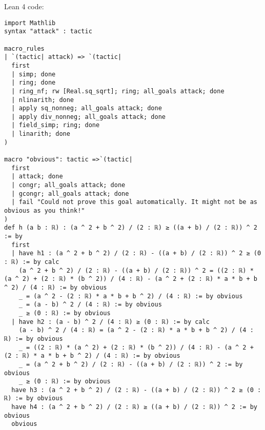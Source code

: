 \documentclass{article}
\begin{document}
Lean 4 code:
\begin{tcolorbox}[colback=white!10, width=\linewidth]
\begin{lstlisting}[language=Lean4]
import Mathlib
syntax "attack" : tactic

macro_rules
| `(tactic| attack) => `(tactic|
  first
  | simp; done
  | ring; done
  | ring_nf; rw [Real.sq_sqrt]; ring; all_goals attack; done
  | nlinarith; done
  | apply sq_nonneg; all_goals attack; done
  | apply div_nonneg; all_goals attack; done
  | field_simp; ring; done
  | linarith; done
)

macro "obvious": tactic =>`(tactic|
  first
  | attack; done
  | congr; all_goals attack; done
  | gcongr; all_goals attack; done
  | fail "Could not prove this goal automatically. It might not be as obvious as you think!"
)
def h (a b : ℝ) : (a ^ 2 + b ^ 2) / (2 : ℝ) ≥ ((a + b) / (2 : ℝ)) ^ 2 := by
  first
  | have h1 : (a ^ 2 + b ^ 2) / (2 : ℝ) - ((a + b) / (2 : ℝ)) ^ 2 ≥ (0 : ℝ) := by calc
    (a ^ 2 + b ^ 2) / (2 : ℝ) - ((a + b) / (2 : ℝ)) ^ 2 = ((2 : ℝ) * (a ^ 2) + (2 : ℝ) * (b ^ 2)) / (4 : ℝ) - (a ^ 2 + (2 : ℝ) * a * b + b ^ 2) / (4 : ℝ) := by obvious
    _ = (a ^ 2 - (2 : ℝ) * a * b + b ^ 2) / (4 : ℝ) := by obvious
    _ = (a - b) ^ 2 / (4 : ℝ) := by obvious
    _ ≥ (0 : ℝ) := by obvious
  | have h2 : (a - b) ^ 2 / (4 : ℝ) ≥ (0 : ℝ) := by calc
    (a - b) ^ 2 / (4 : ℝ) = (a ^ 2 - (2 : ℝ) * a * b + b ^ 2) / (4 : ℝ) := by obvious
    _ = ((2 : ℝ) * (a ^ 2) + (2 : ℝ) * (b ^ 2)) / (4 : ℝ) - (a ^ 2 + (2 : ℝ) * a * b + b ^ 2) / (4 : ℝ) := by obvious
    _ = (a ^ 2 + b ^ 2) / (2 : ℝ) - ((a + b) / (2 : ℝ)) ^ 2 := by obvious
    _ ≥ (0 : ℝ) := by obvious
  have h3 : (a ^ 2 + b ^ 2) / (2 : ℝ) - ((a + b) / (2 : ℝ)) ^ 2 ≥ (0 : ℝ) := by obvious
  have h4 : (a ^ 2 + b ^ 2) / (2 : ℝ) ≥ ((a + b) / (2 : ℝ)) ^ 2 := by obvious
  obvious

\end{lstlisting}
\end{tcolorbox}
\end{document}
